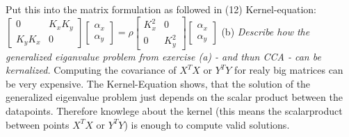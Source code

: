 \documentclass[a4paper, 12pt, titlepage]{article}
\begin{document}
Put this into the matrix formulation as followed in (12) \newline
Kernel-equation:
\newline
$
\begin{bmatrix} 0 & K_xK_y \\ K_yK_x & 0 \end{bmatrix}
\begin{bmatrix} \alpha_x \\ \alpha_y \end{bmatrix} =  \rho
\begin{bmatrix} K^2_x & 0 \\ 0 & K^2_y \end{bmatrix}
\begin{bmatrix} \alpha_x \\ \alpha_y \end{bmatrix}
$ \newline \newline
(b) \textit{ Describe how the generalized eiganvalue problem from exercise (a) - and thun CCA - can be kernalized. }
Computing the covariance of $X^TX$ or $Y^TY$ for realy big matrices can be very expensive. The Kernel-Equation shows, that the solution of the generalized eigenvalue problem just depends on the scalar product between the datapoints. Therefore knowlege  about the kernel (this means the scalarproduct between points $X^TX$ or $Y^TY$) is enough to compute valid solutions.
\end{document}

